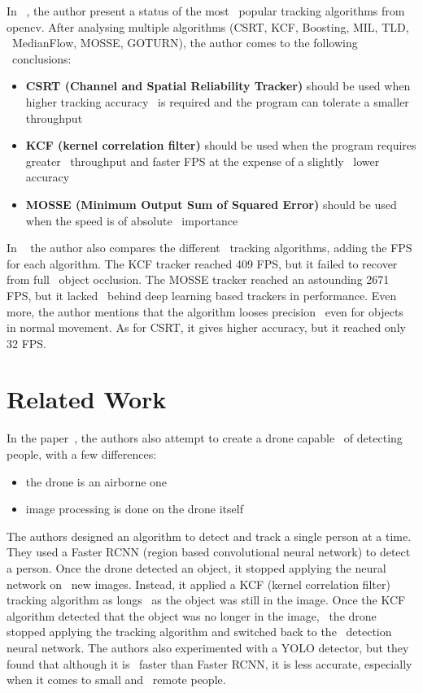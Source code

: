 In ~\cite{OpencvTracking}, the author present a status of the most \
popular tracking algorithms from opencv.
After analysing multiple algorithms (CSRT, KCF, Boosting, MIL, TLD, \
MedianFlow, MOSSE, GOTURN), the author comes to the following \
conclusions:
\begin{itemize}
    \item \textbf{CSRT (Channel and Spatial Reliability Tracker)}  should be used when higher tracking accuracy \
            is required and the program can tolerate a smaller throughput
    \item \textbf{KCF (kernel correlation filter)} should be used when the program requires greater \
            throughput and faster FPS at the expense of a slightly \
            lower accuracy
    \item \textbf{MOSSE (Minimum Output Sum of Squared Error)} should be used when the speed is of absolute \
            importance
\end{itemize}

In ~\cite{OpencvTracking2} the author also compares the different \
tracking algorithms, adding the FPS for each algorithm.
The KCF tracker reached 409 FPS, but it failed to recover from full \
object occlusion.
The MOSSE tracker reached an astounding 2671 FPS, but it lacked \
behind deep learning based trackers in performance.
Even more, the author mentions that the algorithm looses precision \
even for objects in normal movement.
As for CSRT, it gives higher accuracy, but it reached only 32 FPS.


\section{Related Work}
\label{sec:related-word}

In the paper~\cite{deepDrone}, the authors also attempt to create a drone capable \
of detecting people, with a few differences:
\begin{itemize}
    \item the drone is an airborne one
    \item image processing is done on the drone itself
\end{itemize}

The authors designed an algorithm to detect and track a single person at a time.
They used a Faster RCNN (region based convolutional neural network) to detect a person.
Once the drone detected an object, it stopped applying the neural network on \
new images.
Instead, it applied a KCF (kernel correlation filter) tracking algorithm as longs \
as the object was still in the image.
Once the KCF algorithm detected that the object was no longer in the image, \
the drone stopped applying the tracking algorithm and switched back to the \
detection neural network.
The authors also experimented with a YOLO detector, but they found that although it is \
faster than Faster RCNN, it is less accurate, especially when it comes to small and \
remote people.


